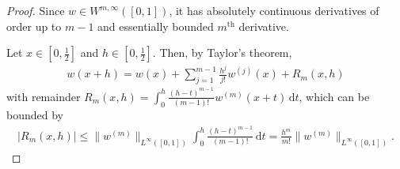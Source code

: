 \documentclass[11pt,a4paper,reqno]{amsart}
\theoremstyle{plain}
\theoremstyle{definition}
\begin{document}
\begin{proof}
	Since $w \in W^{m,\infty}([0,1])$, it has absolutely continuous derivatives of order up to $m-1$ and essentially bounded $m^{\mathrm{th}}$ derivative.
	
	Let $x\in [0, \tfrac{1}{2}]$ and $h\in[0, \tfrac{1}{2}]$. Then, by Taylor's theorem,
	\begin{align*}
		w(x+h) = w(x) + \sum_{j=1}^{m-1} \frac{h^j}{j!} w^{(j)}(x) + R_m(x,h)
	\end{align*}
	with remainder $R_m(x,h) = \int_0^h \frac{(h-t)^{m-1}}{(m-1)!} w^{(m)}(x+t)\,\mathrm{d}t$, which can be bounded by
	\begin{align*}
		|R_m(x,h)| \leq \|w^{(m)}\|_{L^{\infty}([0,1])} \int_0^h \frac{(h-t)^{m-1}}{(m-1)!}\, \mathrm{d}t = \frac{h^m}{m!} \|w^{(m)}\|_{L^{\infty}([0,1])}.
	\end{align*}
	

\end{proof}
\end{document}
